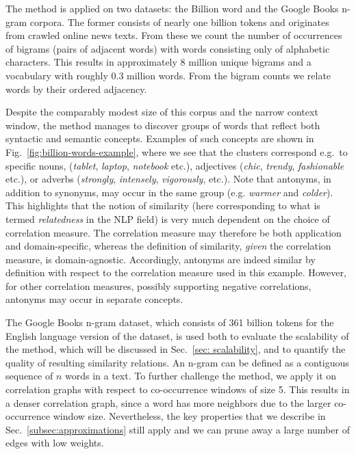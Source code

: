\documentclass[conference]{IEEEtran}
\begin{document}
The method is applied on two datasets: the Billion word \cite{Chelba13} and
the Google Books n-gram \cite{Michel10,Lin12} corpora. The former consists of
nearly one billion tokens and originates from crawled online news texts. From
these we count the number of occurrences of bigrams (pairs of adjacent words) with words consisting only
of alphabetic characters. This results in approximately 8 million unique
bigrams and a vocabulary with roughly 0.3 million words. From the bigram counts
we relate words by their ordered adjacency.

Despite the comparably modest size of this corpus and the narrow context window, the method
manages to discover groups of words that reflect both syntactic and semantic
concepts. Examples of such concepts are shown in Fig.\ \ref{fig:billion-words-example},
where we see that the clusters correspond e.g.\ to specific nouns,
 (\emph{tablet}, \emph{laptop}, \emph{notebook} etc.), adjectives
 (\emph{chic}, \emph{trendy}, \emph{fashionable} etc.), or adverbs
 (\emph{strongly}, \emph{intensely}, \emph{vigorously}, etc.). Note that antonyms, in addition to synonyms, 
 may occur in the same group (e.g. \emph{warmer} and \emph{colder}). This highlights that the notion of similarity (here
 corresponding to what is termed \emph{relatedness} in the NLP field)
 is very much dependent on the choice of correlation measure. The correlation measure may therefore be both
 application and domain-specific, whereas the definition of similarity, \emph{given} the correlation measure, is domain-agnostic. 
 Accordingly, antonyms are indeed similar by definition with respect to the correlation measure used in this example. However, 
 for other correlation measures, possibly supporting negative correlations, antonyms may occur in separate concepts.

The Google Books n-gram dataset, which consists of 361
billion tokens for the English language version of the dataset, is used both to evaluate the scalability of the
method, which will be discussed in Sec.\ \ref{sec: scalability}, and to quantify the quality of resulting similarity
relations. An n-gram can be defined as a contiguous sequence of $n$ words in a text.
To further challenge the method, we apply it on correlation graphs with respect to co-occurrence
windows of size 5. This results in a denser correlation graph, since a
word has more neighbors due to the larger co-occurrence window size. Nevertheless, the
key properties that we describe in Sec.\ \ref{subsec:approximations} still
apply and we can prune away a large number of edges with low weights.
\end{document}
